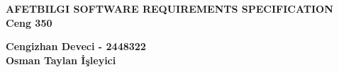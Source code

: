 \documentclass{scrreprt}
\begin{document}
\begin{center}
    {\bfseries
        \Huge{AFETBILGI SOFTWARE REQUIREMENTS SPECIFICATION}\\
        \vspace{1.6cm}
        Ceng 350\\
        \vspace{3.6cm}
    }
\end{center}

\begin{flushleft}
    {\bfseries
        \large{Cengizhan Deveci - 2448322}\\
        \vspace{0.25cm}
        \large{Osman Taylan İşleyici}\\
    }
\end{flushleft}

\tableofcontents
\listoffigures
\listoftables





\end{document}
